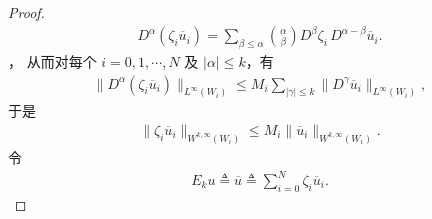 \documentclass[../../main.tex]{subfiles}
\begin{document}
\begin{proof}
\begin{align*}
D^{\alpha}(\zeta_i\overline{u}_i)=\sum_{\beta\leqslant\alpha}\binom{\alpha}{\beta}D^{\beta}\zeta_i\,D^{\alpha-\beta}\overline{u}_i.
\end{align*}，
从而对每个 $i=0,1,\cdots,N$ 及 $|\alpha|\leqslant k$，有
\begin{align*}
\|D^{\alpha}(\zeta_i\overline{u}_i)\|_{L^{\infty}(W_i)}
\leqslant M_i\sum_{|\gamma|\leqslant k}\|D^{\gamma}\overline{u}_i\|_{L^{\infty}(W_i)},
\end{align*}
于是
\begin{align}
\|\zeta_i\overline{u}_i\|_{W^{k,\infty}(W_i)}\leqslant M_i\|\overline{u}_i\|_{W^{k,\infty}(W_i)}.\label{eqnjkNJNS1}
\end{align}
令
\begin{align*}
E_ku\triangleq\overline{u}\triangleq\sum_{i=0}^{N}\zeta_i\overline{u}_i.
\end{align*}


\end{proof}
\end{document}
